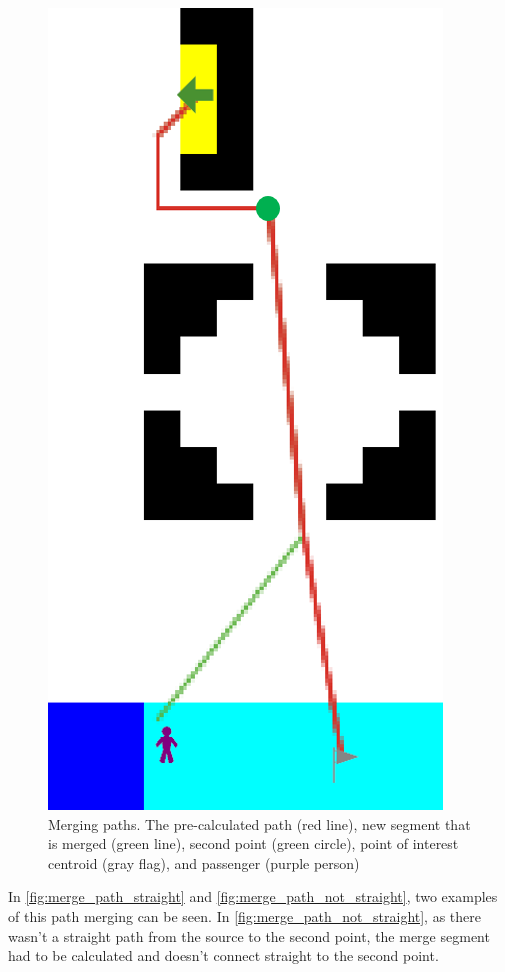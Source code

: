 \begin{figure}
    \centering
    \includegraphics[width=\columnwidth]{assets/merge_path_not_straight.png}
    \caption{Merging paths. The pre-calculated path (red line), new segment that is merged (green line), second point (green circle), point of interest centroid (gray flag), and passenger (purple person)}
    \label{fig:merge_path_not_straight}
\end{figure}
In \autoref{fig:merge_path_straight} and \autoref{fig:merge_path_not_straight}, two examples of this path merging can be seen. In \autoref{fig:merge_path_not_straight}, as there wasn't a straight path from the source to the second point, the merge segment had to be calculated and doesn't connect straight to the second point.

